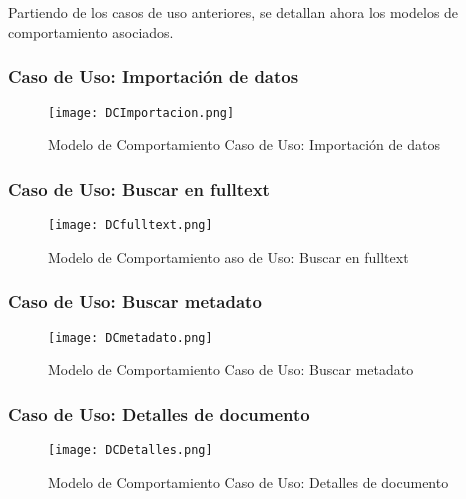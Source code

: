 \section{}
\begin{comment}[inline]{
A partir de los casos de uso anteriores, se crea el modelo de comportamiento. Para ello, se realizarán los diagramas de secuencia del sistema, donde se identificarán las operaciones o servicios del sistema. Luego, se detallará el contrato de las operaciones identificadas.
}
\end{comment}
Partiendo de los casos de uso anteriores, se detallan ahora los modelos de comportamiento asociados.\\

\subsubsection{Caso de Uso: Importación de datos}
\begin{figure}[H]
  \centering
     \texttt{[image: DCImportacion.png]}
  \caption{Modelo de Comportamiento Caso de Uso: Importación de datos}
  \label{image:compoimport}
\end{figure}
\subsubsection{Caso de Uso: Buscar en \gls{fulltext}}
\begin{figure}[H]
  \centering
     \texttt{[image: DCfulltext.png]}
  \caption{Modelo de Comportamiento aso de Uso: Buscar en \gls{fulltext}}
  \label{image:compofulltext}
\end{figure}
\subsubsection{Caso de Uso: Buscar \gls{metadato}}
\begin{figure}[H]
  \centering
     \texttt{[image: DCmetadato.png]}
  \caption{Modelo de Comportamiento Caso de Uso: Buscar \gls{metadato}}
  \label{image:compobusmeta}
\end{figure}
\subsubsection{Caso de Uso: Detalles de documento}
\begin{figure}[H]
  \centering
     \texttt{[image: DCDetalles.png]}
  \caption{Modelo de Comportamiento Caso de Uso: Detalles de documento}
  \label{image:compodetalles}
\end{figure}
